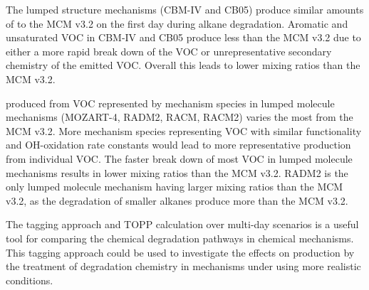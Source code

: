 The lumped structure mechanisms (CBM-IV and CB05) produce similar amounts of  to the MCM v3.2 on the first day during alkane degradation.
Aromatic and unsaturated VOC in CBM-IV and CB05 produce less  than the MCM v3.2 due to either a more rapid break down of the VOC or unrepresentative secondary chemistry of the emitted VOC.
Overall this leads to lower  mixing ratios than the MCM v3.2.

 produced from VOC represented by mechanism species in lumped molecule mechanisms (MOZART-4, RADM2, RACM, RACM2) varies the most from the MCM v3.2.
More mechanism species representing VOC with similar functionality and OH-oxidation rate constants would lead to more representative  production from individual VOC.
The faster break down of most VOC in lumped molecule mechanisms results in lower  mixing ratios than the MCM v3.2.
RADM2 is the only lumped molecule mechanism having larger  mixing ratios than the MCM v3.2, as the degradation of smaller alkanes produce more  than the MCM v3.2.

The tagging approach and TOPP calculation over multi-day scenarios is a useful tool for comparing the chemical degradation pathways in chemical mechanisms. 
This tagging approach could be used to investigate the effects on  production by the treatment of degradation chemistry in mechanisms under using more realistic  conditions.
